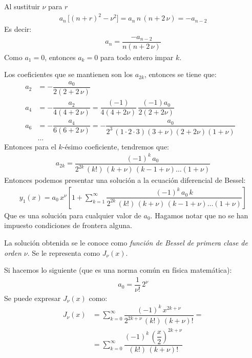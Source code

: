 Al sustituir $\nu$ para $r$
\begin{align*}
a_{n} \, \big[ (n + r)^{2} - \nu^{2} \big] = a_{n} \, n \, (n + 2 \, \nu) = - a_{n-2}
\end{align*}
Es decir:
\begin{align*}
a_{n} = \dfrac{- a_{n-2}}{n (n + 2 \, \nu)}
\end{align*}
Como $a_{1} = 0$, entonces $a_{k} = 0$ para todo entero impar $k$.
\par
Los coeficientes que se mantienen son los $a_{2 k}$, entonces se tiene que:
\begin{align*}
a_{2} &= - \dfrac{a_{0}}{2 (2 + 2 \, \nu)} \\[0.5em]
a_{4} &= - \dfrac{a_{2}}{4 (4 + 2 \, \nu)} = \dfrac{(-1)}{4 (4 + 2 \nu)} \, \dfrac{(-1)a_{0}}{2 (2 + 2 \nu)} \\[0.5em]
a_{6} &= - \dfrac{a_{4}}{6 (6 + 2 \, \nu)} = - \dfrac{a_{0}}{2^{3} \, (1 \cdot 2 \cdot 3) (3 + \nu)(2 + 2 \nu)(1 + \nu)}\\
&\ldots&
\end{align*}
Entonces para el $k$-ésimo coeficiente, tendremos que:
\begin{align*}
a_{2k} = \dfrac{(-1)^{k} \, a_{0}}{2^{2 k} \, (k!) \, (k + \nu) \, (k - 1 + \nu) \ldots (1 + \nu)}
\end{align*}
Entonces podemos presentar una solución a la ecuación diferencial de Bessel:
\begin{align*}
y_{1}(x) = a_{0} \, x^{\nu} \left[ 1 + \sum_{k=1}^{\infty} \dfrac{(-1)^{k} \, a_{0} \, k}{2^{2 k} \, (k!) \, (k + \nu) \, (k -1 + \nu)\ldots (1 + \nu)} \right]
\end{align*}
Que es una solución para cualquier valor de $a_{0}$. Hagamos notar que no se han impuesto condiciones de frontera alguna.
\par
La solución obtenida se le conoce como \emph{función de Bessel de primera clase de orden $\nu$}. Se le representa como $J_{\nu} (x)$.
\par
Si hacemos lo siguiente (que es una norma común en física matemática):
\begin{align*}
a_{0} = \dfrac{1}{\nu!} \, 2^{\nu}
\end{align*}
Se puede expresar $J_{\nu}(x)$ como:
\begin{align*}
J_{\nu}(x) &= \sum_{k=0}^{\infty} \dfrac{(-1)^{k} \, x^{2k+\nu}}{2^{2k+\nu} \, (k!) \, (k + \nu)!} = \\[1em]
&= \sum_{k=0}^{\infty} \dfrac{(-1)^{k} \, \left( \dfrac{x}{2}\right)^{2k+\nu}}{(k!) \, (k + \nu)!}
\end{align*}
